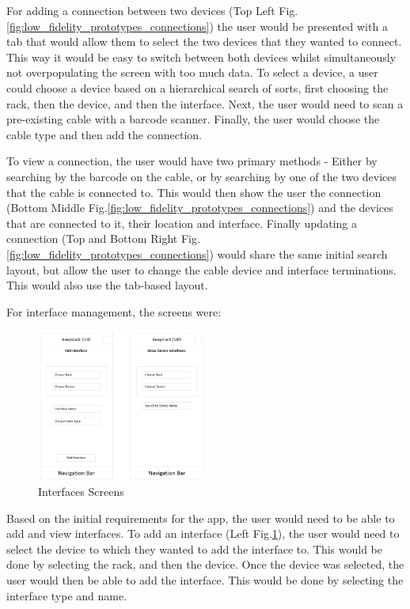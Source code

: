 \documentclass [11pt,a4paper]{article}
\begin{document}
For adding a connection between two devices (Top Left Fig.\ref{fig:low_fidelity_prototypes_connections}) the user would be presented with a tab that would allow them to select the two devices that they wanted to connect. This way it would be easy to switch between both devices whilst simultaneously not overpopulating the screen with too much data. To select a device, a user could choose a device based on a hierarchical search of sorts, first choosing the rack, then the device, and then the interface. Next, the user would need to scan a pre-existing cable with a barcode scanner. Finally, the user would choose the cable type and then add the connection. 

To view a connection, the user would have two primary methods - Either by searching by the barcode on the cable, or by searching by one of the two devices that the cable is connected to. This would then show the user the connection (Bottom Middle Fig.\ref{fig:low_fidelity_prototypes_connections}) and the devices that are connected to it, their location and interface. Finally updating a connection (Top and Bottom Right Fig.\ref{fig:low_fidelity_prototypes_connections}) would share the same initial search layout, but allow the user to change the cable device and interface terminations. This would also use the tab-based layout. 

\pagebreak

For interface management, the screens were:
\begin{figure}[H]
    \centering
    \includegraphics[width=0.50\textwidth]{images/initial_prototype_interfaces.png}
    \caption{Interfaces Screens}
    \label{fig:low_fidelity_prototypes_interfaces}
\end{figure}

Based on the initial requirements for the app, the user would need to be able to add and view interfaces. To add an interface (Left Fig.\ref{fig:low_fidelity_prototypes_interfaces}), the user would need to select the device to which they wanted to add the interface to. This would be done by selecting the rack, and then the device. Once the device was selected, the user would then be able to add the interface. This would be done by selecting the interface type and name. 
\end{document}
